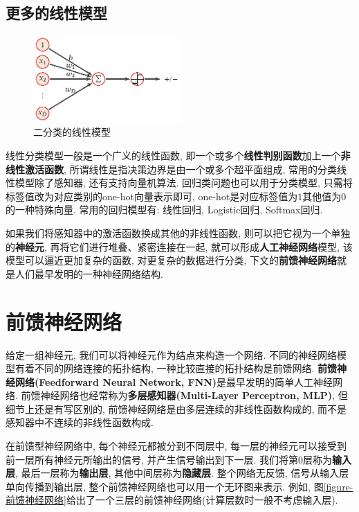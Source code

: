\documentclass[12pt, a4paper, oneside]{ctexart}
\begin{document}
\subsection{更多的线性模型}
\begin{figure}[h]
    \centering
    \includegraphics[width=0.5\textwidth]{二分类的线性模型.eps}
    \caption{二分类的线性模型\protect\footnotemark[1]}
    \label{figure-Perceptron}
\end{figure}

线性分类模型一般是一个广义的线性函数, 即一个或多个\textbf{线性判别函数}加上一个\textbf{非线性激活函数}, 所谓线性是指决策边界是由一个或多个超平面组成, 常用的分类线性模型除了感知器, 还有支持向量机算法. 回归类问题也可以用于分类模型, 只需将标签值改为对应类别的one-hot向量表示即可, one-hot是对应标签值为$1$其他值为$0$的一种特殊向量. 常用的回归模型有: 线性回归, Logistic回归, Softmax回归.

如果我们将感知器中的激活函数换成其他的非线性函数, 则可以把它视为一个单独的\textbf{神经元}, 再将它们进行堆叠、紧密连接在一起, 就可以形成\textbf{人工神经网络}模型, 该模型可以逼近更加复杂的函数, 对更复杂的数据进行分类, 下文的\textbf{前馈神经网络}就是人们最早发明的一种神经网络结构.

\section{前馈神经网络}
给定一组神经元, 我们可以将神经元作为结点来构造一个网络. 不同的神经网络模型有着不同的网络连接的拓扑结构, 一种比较直接的拓扑结构是前馈网络. \textbf{前馈神经网络(Feedforward Neural Network, FNN)}是最早发明的简单人工神经网络. 前馈神经网络也经常称为\textbf{多层感知器(Multi-Layer Perceptron, MLP)}, 但细节上还是有写区别的, 前馈神经网络是由多层连续的非线性函数构成的, 而不是感知器中不连续的非线性函数构成.

在前馈型神经网络中, 每个神经元都被分到不同层中, 每一层的神经元可以接受到前一层所有神经元所输出的信号, 并产生信号输出到下一层. 我们将第$0$层称为\textbf{输入层}, 最后一层称为\textbf{输出层}, 其他中间层称为\textbf{隐藏层}. 整个网络无反馈, 信号从输入层单向传播到输出层, 整个前馈神经网络也可以用一个无环图来表示. 例如, 图\ref{figure-前馈神经网络}给出了一个三层的前馈神经网络(计算层数时一般不考虑输入层).
\end{document}
